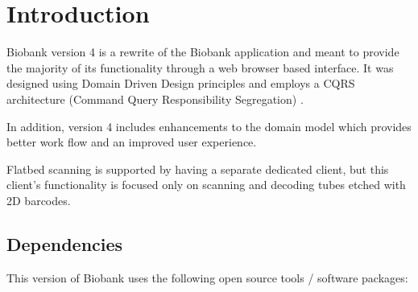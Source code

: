 \chapter{Introduction}

Biobank version 4 is a rewrite of the Biobank application and meant to provide
the majority of its functionality through a web browser based interface. It was
designed using Domain Driven Design principles \cite{evans2004domain} and
employs a CQRS architecture (Command Query Responsibility Segregation)
\cite{vernon2013implementing}.

In addition, version 4 includes enhancements to the domain model which provides
better work flow and an improved user experience.

Flatbed scanning is supported by having a separate dedicated client, but this
client's functionality is focused only on scanning and decoding tubes etched
with 2D barcodes.

\section{Dependencies}

This version of Biobank uses the following open source tools / software packages:

